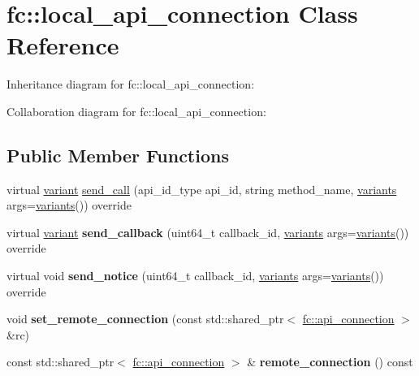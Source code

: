 \hypertarget{classfc_1_1local__api__connection}{}\section{fc\+:\+:local\+\_\+api\+\_\+connection Class Reference}
\label{classfc_1_1local__api__connection}


Inheritance diagram for fc\+:\+:local\+\_\+api\+\_\+connection\+:


Collaboration diagram for fc\+:\+:local\+\_\+api\+\_\+connection\+:
\subsection*{Public Member Functions}
\begin{DoxyCompactItemize}
\item 
virtual \mbox{\hyperlink{classfc_1_1variant}{variant}} \mbox{\hyperlink{classfc_1_1local__api__connection_a95994755615aedc3f14f7ac7e5085a00}{send\+\_\+call}} (api\+\_\+id\+\_\+type api\+\_\+id, string method\+\_\+name, \mbox{\hyperlink{classstd_1_1vector}{variants}} args=\mbox{\hyperlink{classstd_1_1vector}{variants}}()) override
\item 
\mbox{\label{classfc_1_1local__api__connection_ad546fad508d9fe0fb14b371ddabb9cc7}} 
virtual \mbox{\hyperlink{classfc_1_1variant}{variant}} {\bfseries send\+\_\+callback} (uint64\+\_\+t callback\+\_\+id, \mbox{\hyperlink{classstd_1_1vector}{variants}} args=\mbox{\hyperlink{classstd_1_1vector}{variants}}()) override
\item 
\mbox{\label{classfc_1_1local__api__connection_a954b2a8148847c29650ed8bdbb3bc076}} 
virtual void {\bfseries send\+\_\+notice} (uint64\+\_\+t callback\+\_\+id, \mbox{\hyperlink{classstd_1_1vector}{variants}} args=\mbox{\hyperlink{classstd_1_1vector}{variants}}()) override
\item 
\mbox{\label{classfc_1_1local__api__connection_a5d7854375da8c0045e2e24b70798a952}} 
void {\bfseries set\+\_\+remote\+\_\+connection} (const std\+::shared\+\_\+ptr$<$ \mbox{\hyperlink{classfc_1_1api__connection}{fc\+::api\+\_\+connection}} $>$ \&rc)
\item 
\mbox{\label{classfc_1_1local__api__connection_ab24d15e37f69803bbf6394c97765a8f8}} 
const std\+::shared\+\_\+ptr$<$ \mbox{\hyperlink{classfc_1_1api__connection}{fc\+::api\+\_\+connection}} $>$ \& {\bfseries remote\+\_\+connection} () const
\end{DoxyCompactItemize}

